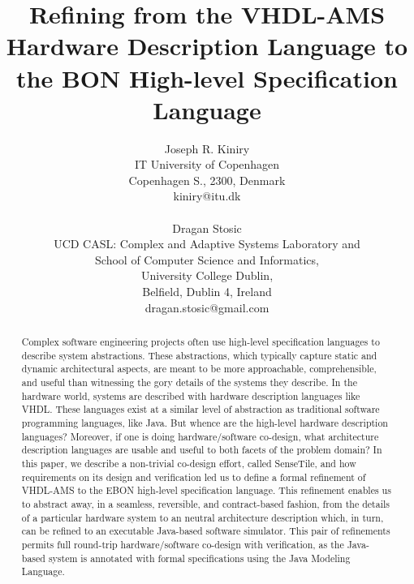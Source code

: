 \documentclass{article}
\begin{document}
\title{Refining from the VHDL-AMS Hardware Description Language 
to the BON High-level Specification Language}

\author{Joseph R. Kiniry\\
IT University of Copenhagen\\
Copenhagen S., 2300, Denmark\\
kiniry@itu.dk\\
\\
Dragan Stosic\\
UCD CASL: Complex and Adaptive Systems Laboratory and\\
School of Computer Science and Informatics,\\
University College Dublin,\\
Belfield, Dublin 4, Ireland\\
dragan.stosic@gmail.com
}

\maketitle

\begin{abstract}

  Complex software engineering projects often use high-level
  specification languages to describe system abstractions.  These
  abstractions, which typically capture static and dynamic
  architectural aspects, are meant to be more approachable,
  comprehensible, and useful than witnessing the gory details of the
  systems they describe.  In the hardware world, systems are described
  with hardware description languages like VHDL.  These languages
  exist at a similar level of abstraction as traditional software
  programming languages, like Java.  But whence are the high-level
  hardware description languages?  Moreover, if one is doing
  hardware/software co-design, what architecture description languages
  are usable and useful to both facets of the problem domain?  In this
  paper, we describe a non-trivial co-design effort, called SenseTile,
  and how requirements on its design and verification led us to define
  a formal refinement of VHDL-AMS to the EBON high-level specification
  language.  This refinement enables us to abstract away, in a
  seamless, reversible, and contract-based fashion, from the details
  of a particular hardware system to an neutral architecture
  description which, in turn, can be refined to an executable
  Java-based software simulator.  This pair of refinements permits
  full round-trip hardware/software co-design with verification, as
  the Java-based system is annotated with formal specifications using
  the Java Modeling Language.

\end{abstract}
\end{document}
